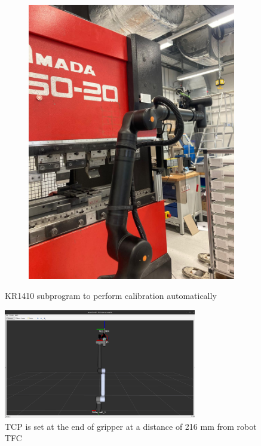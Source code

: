 \begin{figure}[h]
\begin{subfigure}{0.48\textwidth}
        \includegraphics[width=\textwidth, angle=0]{figures/001calibration/calibration-process-right.jpeg} %
        \label{fig:calibration-process-right}
    \end{subfigure}
    \caption{KR1410 subprogram to perform calibration automatically}
    \label{fig:auto-calibration-process}
\end{figure}

\begin{figure}[h]
    \centering
    \includegraphics[width=0.75\textwidth]{6. System Integration and Testing/6.2 Calibration Procedures/tcp.PNG}
    \caption{TCP is set at the end of gripper at a distance of 216 mm from robot TFC}
    \label{fig:tcp}
\end{figure}




